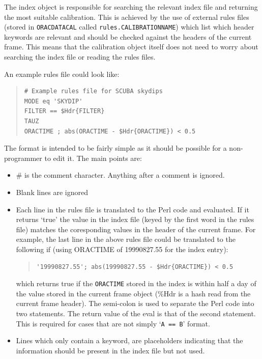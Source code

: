\documentclass[twoside,11pt]{article}
\renewcommand{\_}{\texttt{\symbol{95}}}
\newenvironment{myquote}{\begin{quote}\begin{small}}{\end{small}\end{quote}}
\begin{document}
The index object is responsible for searching the relevant index
file and returning the most suitable calibration. This is achieved by
the use of external rules files (stored in \texttt{ORAC\_DATA\_CAL}
called \texttt{rules.CALIBRATION\_NAME}) which list which header
keywords are relevant and should be checked against the headers of the
current frame. This means that the calibration object itself does not
need to worry about searching the index file or reading the rules
files. 

An example rules file could look like:
\begin{myquote}
\begin{verbatim}
# Example rules file for SCUBA skydips
MODE eq 'SKYDIP'
FILTER == $Hdr{FILTER}
TAUZ
ORACTIME ; abs(ORACTIME - $Hdr{ORACTIME}) < 0.5
\end{verbatim}
\end{myquote}

The format is intended to be fairly simple as it should be possible
for a non-programmer to edit it. The main points are:

\begin{itemize}
\item \# is the comment character. Anything after a comment is
ignored.
\item Blank lines are ignored
\item Each line in the rules file is translated to the Perl code and
evaluated. If it returns `true' the value in the index file (keyed by
the first word in the rules file) matches the coresponding values in
the header of the current frame. For example, the last line in the
above rules file could be translated to the following if (using
ORACTIME of 19990827.55 for the index entry):
\begin{myquote}
\begin{verbatim}
'19990827.55'; abs(19990827.55 - $Hdr{ORACTIME}) < 0.5 
\end{verbatim}
\end{myquote} %
which returns true if the \texttt{ORACTIME} stored in the index is
within half a day of the value stored in the current frame object
(\%Hdr is a hash read from the current frame header).
The semi-colon is used to separate the Perl code into two statements.
The return value of the eval is that of the second statement. This is
required for cases that are not simply `\texttt{A == B}' format.
\item Lines which only contain a keyword, are placeholders indicating
that the information should be present in the index file but not used.
\end{itemize}
\end{document}
